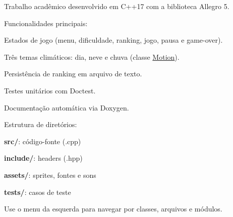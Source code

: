 Trabalho acadêmico desenvolvido em C++17 com a biblioteca Allegro 5.

Funcionalidades principais\+:
\begin{DoxyItemize}
\item Estados de jogo (menu, dificuldade, ranking, jogo, pausa e game-\/over).
\item Três temas climáticos\+: dia, neve e chuva (classe \mbox{\hyperlink{classMotion}{Motion}}).
\item Persistência de ranking em arquivo de texto.
\item Testes unitários com Doctest.
\item Documentação automática via Doxygen.
\end{DoxyItemize}

Estrutura de diretórios\+:
\begin{DoxyItemize}
\item {\bfseries{src/}}\+: código-\/fonte (.cpp)
\item {\bfseries{include/}}\+: headers (.hpp)
\item {\bfseries{assets/}}\+: sprites, fontes e sons
\item {\bfseries{tests/}}\+: casos de teste
\end{DoxyItemize}

Use o menu da esquerda para navegar por classes, arquivos e módulos. 